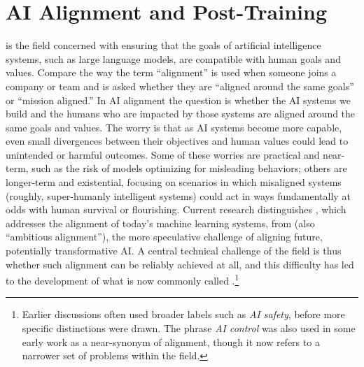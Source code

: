 \chapter{AI Alignment and Post-Training}\label{ch_ai_alignment}






 is the field concerned with ensuring that the goals of artificial intelligence systems, such as large language models, are compatible with human goals and values. Compare the way the term ``alignment''  is used when someone joins a company or team and is asked whether they are ``aligned around the same goals'' or ``mission aligned.''  In AI alignment the question is whether the AI systems we build and the humans who are impacted by those systems are aligned around the same goals and values. The worry is that as AI systems become more capable, even small divergences between their objectives and human values could lead to unintended or harmful outcomes.  Some of these worries are practical and near-term, such as the risk of models optimizing for misleading behaviors; others are longer-term and existential, focusing on scenarios in which misaligned  systems (roughly, super-humanly intelligent systems) could act in ways fundamentally at odds with human survival or flourishing. Current research distinguishes , which addresses the alignment of today’s machine learning systems, from  (also ``ambitious alignment''), the more speculative challenge of aligning future, potentially transformative AI. A central technical challenge of the field is thus whether such alignment can be reliably achieved at all, and this difficulty has led to the development of what is now commonly called .\footnote{Earlier discussions often used broader labels such as \emph{AI safety}, before more specific distinctions were drawn.  The phrase \emph{AI control} was also used in some early work as a near-synonym of alignment, though it now refers to a narrower set of problems within the field.}


